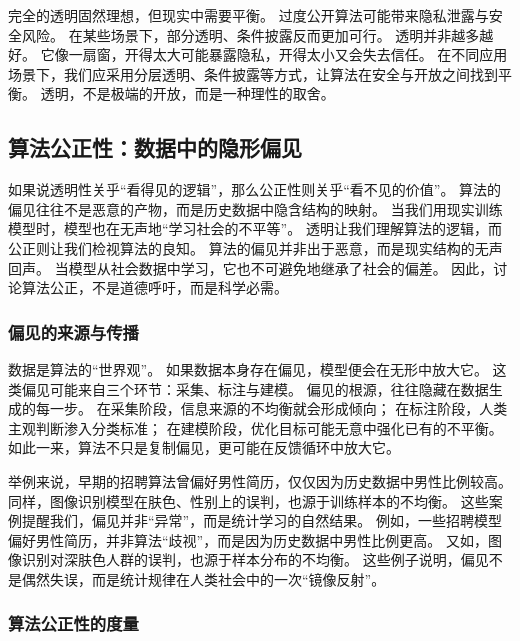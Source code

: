 完全的透明固然理想，但现实中需要平衡。  
过度公开算法可能带来隐私泄露与安全风险。  
在某些场景下，部分透明、条件披露反而更加可行。  
透明并非越多越好。  
它像一扇窗，开得太大可能暴露隐私，开得太小又会失去信任。  
在不同应用场景下，我们应采用分层透明、条件披露等方式，让算法在安全与开放之间找到平衡。  
透明，不是极端的开放，而是一种理性的取舍。


\subsection{算法公正性：数据中的隐形偏见}

如果说透明性关乎“看得见的逻辑”，那么公正性则关乎“看不见的价值”。  
算法的偏见往往不是恶意的产物，而是历史数据中隐含结构的映射。  
当我们用现实训练模型时，模型也在无声地“学习社会的不平等”。  
透明让我们理解算法的逻辑，而公正则让我们检视算法的良知。  
算法的偏见并非出于恶意，而是现实结构的无声回声。  
当模型从社会数据中学习，它也不可避免地继承了社会的偏差。  
因此，讨论算法公正，不是道德呼吁，而是科学必需。

\subsubsection{偏见的来源与传播}

数据是算法的“世界观”。  
如果数据本身存在偏见，模型便会在无形中放大它。  
这类偏见可能来自三个环节：采集、标注与建模。  
偏见的根源，往往隐藏在数据生成的每一步。  
在采集阶段，信息来源的不均衡就会形成倾向；  
在标注阶段，人类主观判断渗入分类标准；  
在建模阶段，优化目标可能无意中强化已有的不平衡。  
如此一来，算法不只是复制偏见，更可能在反馈循环中放大它。

举例来说，早期的招聘算法曾偏好男性简历，仅仅因为历史数据中男性比例较高。  
同样，图像识别模型在肤色、性别上的误判，也源于训练样本的不均衡。  
这些案例提醒我们，偏见并非“异常”，而是统计学习的自然结果。  
例如，一些招聘模型偏好男性简历，并非算法“歧视”，而是因为历史数据中男性比例更高。  
又如，图像识别对深肤色人群的误判，也源于样本分布的不均衡。  
这些例子说明，偏见不是偶然失误，而是统计规律在人类社会中的一次“镜像反射”。

\subsubsection{算法公正性的度量}

